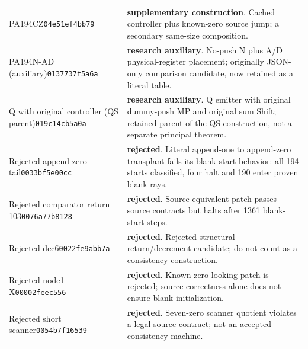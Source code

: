 \begin{longtable}{p{.28\linewidth}p{.64\linewidth}}
PA194CZ\newline\texttt{04e51ef4bb79} & \textbf{supplementary construction}. Cached controller plus known-zero source jump; a secondary same-size composition.\\[5pt]
PA194N-AD (auxiliary)\newline\texttt{0137737f5a6a} & \textbf{research auxiliary}. No-push N plus A/D physical-register placement; originally JSON-only comparison candidate, now retained as a literal table.\\[5pt]
Q with original controller (QS parent)\newline\texttt{019c14cb5a0a} & \textbf{research auxiliary}. Q emitter with original dummy-push MP and original sum Shift; retained parent of the QS construction, not a separate principal theorem.\\[5pt]
Rejected append-zero tail\newline\texttt{0033bf5e00cc} & \textbf{rejected}. Literal append-one to append-zero transplant fails its blank-start behavior: all 194 starts classified, four halt and 190 enter proven blank rays.\\[5pt]
Rejected comparator return 103\newline\texttt{0076a77b8128} & \textbf{rejected}. Source-equivalent patch passes source contracts but halts after 1361 blank-start steps.\\[5pt]
Rejected dec6\newline\texttt{0022fe9abb7a} & \textbf{rejected}. Rejected structural return/decrement candidate; do not count as a consistency construction.\\[5pt]
Rejected node1-X\newline\texttt{00002feec556} & \textbf{rejected}. Known-zero-looking patch is rejected; source correctness alone does not ensure blank initialization.\\[5pt]
Rejected short scanner\newline\texttt{0054b7f16539} & \textbf{rejected}. Seven-zero scanner quotient violates a legal source contract; not an accepted consistency machine.\\[5pt]
\bottomrule\end{longtable}\endgroup
